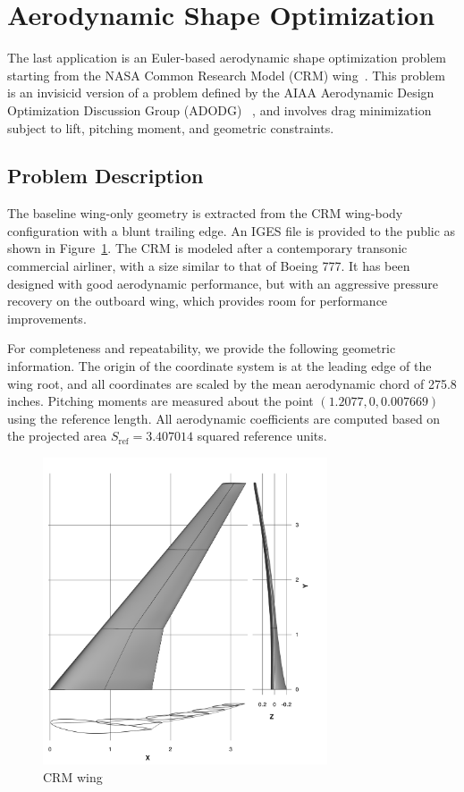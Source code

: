 \section{Aerodynamic Shape Optimization}

The last application is an Euler-based aerodynamic shape optimization problem starting from the NASA Common Research Model (CRM) wing~\cite{crm_wing}. This problem is an invisicid version of a problem defined by
the AIAA Aerodynamic Design Optimization Discussion Group (ADODG) ~\cite{adodg}, and involves drag minimization subject to lift, pitching moment, and geometric constraints.   

\subsection{Problem Description}
The baseline wing-only geometry is extracted from the CRM wing-body configuration with a blunt trailing edge. An IGES file is provided to the public as shown in Figure~\ref{fig:crm_wing}. The CRM is modeled after a contemporary transonic commercial airliner, with a size similar to that of Boeing 777. It has been designed with good aerodynamic performance, but with an aggressive pressure recovery on the outboard wing, which provides room for performance improvements. 

For completeness and repeatability, we provide the following geometric information. 
The origin of the coordinate system is at the leading edge of the wing root, and all coordinates are scaled by the mean aerodynamic chord of 275.8 inches. Pitching moments are measured about the point $(1.2077, 0, 0.007669)$ using the reference length. All aerodynamic coefficients are computed based on the projected area $S_{\text{ref}}=3.407014$ squared reference units. 

\begin{figure}[tbp]
  \centering
  \includegraphics[clip,width=0.75\textwidth]{./figs/chap7_aso/CRM-wing.png}%
  \caption{CRM wing \label{fig:crm_wing} \cite{2015lyu_crm}}
\end{figure}


